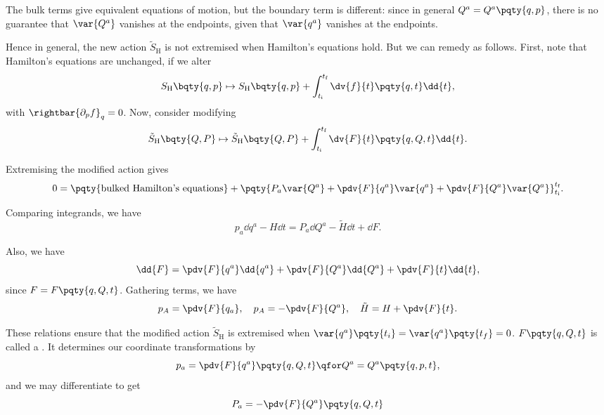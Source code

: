 The bulk terms give equivalent equations of motion, but the boundary term is different: since in general \(Q^a = Q^a \pqty{q, p}\), there is no guarantee that \(\var{Q^a}\) vanishes at the endpoints, given that \(\var{q^a}\) vanishes at the endpoints.

Hence in general, the new action \(\tilde{S}_{\text{H}}\) is not extremised when Hamilton's equations hold. But we can remedy as follows. First, note that Hamilton's equations are unchanged, if we alter
\begin{equation}
    S_{\text{H}}\bqty{q, p} \mapsto S_{\text{H}}\bqty{q, p} + \int_{t_{\text{i}}}^{t_{\text{f}}} \dv{f}{t} \pqty{q, t} \dd{t},
\end{equation}
with \(\rightbar{\partial_p f}_q = 0\). Now, consider modifying
\begin{equation}
    \tilde{S}_{\text{H}} \bqty{Q, P} \mapsto \tilde{S}_{\text{H}} \bqty{Q, P} + \int_{t_{\text{i}}}^{t_{\text{f}}} \dv{F}{t} \pqty{q, Q, t} \dd{t}.
\end{equation}

Extremising the modified action gives
\begin{equation}
    0 = \pqty{\text{bulked Hamilton's equations}} + \pqty{P_a \var{Q^a} + \pdv{F}{q^a} \var{q^a} + \pdv{F}{Q^a} \var{Q^a}}_{t_{\text{i}}}^{t_{\text{f}}}.
\end{equation}

Comparing integrands, we have
\begin{equation}
    p_a \dd{q^a} - H \dd{t} = P_a \dd{Q^a} - \tilde{H} \dd{t} + \dd{F}.
\end{equation}

Also, we have
\begin{equation}
    \dd{F} = \pdv{F}{q^a} \dd{q^a} + \pdv{F}{Q^a} \dd{Q^a} + \pdv{F}{t} \dd{t},
\end{equation}
since \(F = F\pqty{q, Q, t}\). Gathering terms, we have
\begin{equation}
    p_A = \pdv{F}{q_a}, \quad p_A = - \pdv{F}{Q^a}, \quad \tilde{H} = H + \pdv{F}{t}.
\end{equation}

These relations ensure that the modified action \(\tilde{S}_{\text{H}}\) is extremised when \(\var{q^a}\pqty{t_i} = \var{q^a}\pqty{t_f} = 0\). \(F\pqty{q, Q, t}\) is called a . It determines our coordinate transformations by
\begin{equation}
    p_a = \pdv{F}{q^a} \pqty{q, Q, t} \qfor Q^a = Q^a\pqty{q, p, t},
\end{equation}
and we may differentiate to get
\begin{equation}
    P_a = - \pdv{F}{Q^a} \pqty{q, Q, t}
\end{equation}

